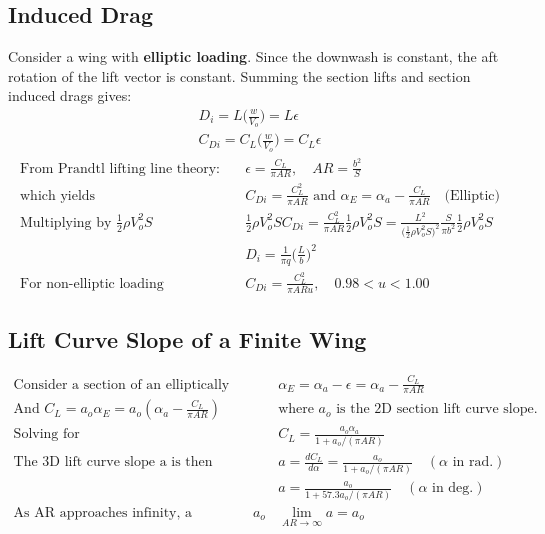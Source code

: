 \documentclass[draft=false, titlepage]{article}
\begin{document}
\subsection{Induced Drag}
Consider a wing with \textbf{elliptic loading}. Since the downwash is constant, the aft rotation of the lift vector is constant. Summing the section lifts and section induced drags gives:
\begin{gather*}
D_i = L\big(\frac{w}{V_o}\big) = L\epsilon\\
C_{Di} = C_L \big(\frac{w}{V_o}\big) = C_L\epsilon
\end{gather*}
\begin{align*}
\text{From Prandtl lifting line theory:} &\quad
\epsilon = \frac{C_L}{\pi AR},\quad AR = \frac{b^2}{S}\\
\text{which yields} &\quad C_{Di} = \frac{C_L^2}{\pi AR} \text{ and } \alpha_E = \alpha_a - \frac{C_L}{\pi AR} \quad \text{(Elliptic)}\\
\text{Multiplying by } \frac{1}{2}\rho V_o^2 S&\quad
\frac{1}{2}\rho V_o^2S C_{Di} = \frac{C_L^2}{\pi AR} \frac{1}{2}\rho V_o^2S = \frac{L^2}{\big(\frac{1}{2}\rho V_o^2 S\big)^2} \frac{S}{\pi b^2}\frac{1}{2} \rho V_o^2 S\\
&\quad D_i = \frac{1}{\pi q} \Big(\frac{L}{b}\Big)^2\\
\text{For non-elliptic loading}&\quad
C_{Di} = \frac{C_L^2}{\pi AR u},\quad 0.98 < u < 1.00
\end{align*}

\subsection{Lift Curve Slope of a Finite Wing}
\begin{align*}
\text{Consider a section of an elliptically loaded wing:}&\quad
\alpha_E = \alpha_a - \epsilon = \alpha_a - \frac{C_L}{\pi AR}\\
\text{And } C_L = a_o \alpha_E = a_o (\alpha_a - \frac{C_L}{\pi AR})&\quad \text{where } a_o \text{ is the 2D section lift curve slope.}\\
\text{Solving for }&\quad
C_L = \frac{a_o \alpha_a}{1+a_o/(\pi AR)}\\
\text{The 3D lift curve slope a is then}&\quad
a = \frac{dC_L}{d\alpha} = \frac{a_o}{1+a_o/(\pi AR)}\quad (\alpha \text{ in rad.})\\
&\quad a = \frac{a_o}{1+57.3a_o/(\pi AR)}\quad (\alpha \text{ in deg.})\\
\text{As AR approaches infinity, a approaches } a_o&\quad \lim_{AR\rightarrow \infty} a = a_o
\end{align*}
\end{document}

